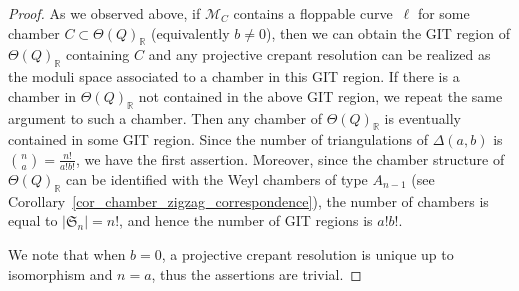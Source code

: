 \documentclass[pdftex]{sigma}
\numberwithin{equation}{section}
\theoremstyle{definition}
\newcommand{\RR}{\mathbb{R}}
\newcommand{\calM}{\mathcal{M}}
\newcommand{\fkS}{\mathfrak{S}}
\begin{document}
\begin{proof}
As we observed above, if $\calM_C$ contains a floppable curve~$\ell$ for some chamber $C\subset \Theta(Q)_\RR$ (equivalently $b\neq 0$),
then we can obtain the GIT region of $\Theta(Q)_\RR$ containing $C$ and any projective crepant resolution can be realized as the moduli space
associated to a chamber in this GIT region.
If there is a chamber in $\Theta(Q)_\RR$ not contained in the above GIT region, we repeat the same argument to such a chamber.
Then any chamber of $\Theta(Q)_\RR$ is eventually contained in some GIT region.
Since the number of triangulations of $\Delta(a,b)$ is ${n \choose a}=\frac{n!}{a! b!}$, we have the first assertion.
Moreover, since the chamber structure of $\Theta(Q)_\RR$ can be identified with the Weyl chambers of type $A_{n-1}$ (see Corollary~\ref{cor_chamber_zigzag_correspondence}),
the number of chambers is equal to $|\fkS_n|=n!$, and hence the number of GIT regions is $a! b!$.

We note that when $b=0$, a projective crepant resolution is unique up to isomorphism and $n=a$, thus the assertions are trivial.
\end{proof}
\end{document}
